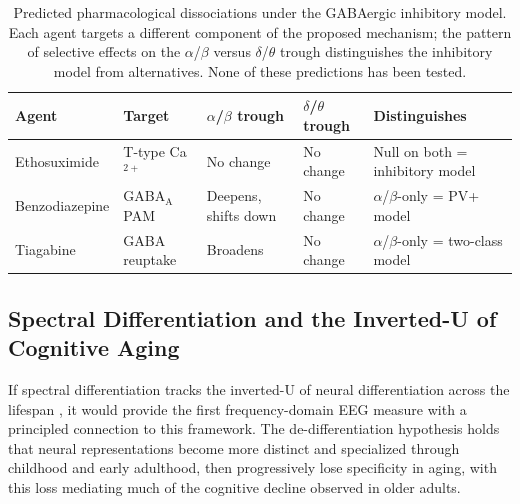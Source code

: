 \begin{table}[h]
\centering
\caption{Predicted pharmacological dissociations under the GABAergic inhibitory model. Each agent targets a different component of the proposed mechanism; the pattern of selective effects on the $\alpha$/$\beta$ versus $\delta$/$\theta$ trough distinguishes the inhibitory model from alternatives. None of these predictions has been tested.}
\label{tab:pharmacological}
\begin{tabular}{l l l l l}
\toprule
Agent & Target & $\alpha$/$\beta$ trough & $\delta$/$\theta$ trough & Distinguishes \\
\midrule
Ethosuximide & T-type Ca$^{2+}$ & No change & No change & Null on both = inhibitory model \\
Benzodiazepine & GABA$_\text{A}$ PAM & Deepens, shifts down & No change & $\alpha$/$\beta$-only = PV+ model \\
Tiagabine & GABA reuptake & Broadens & No change & $\alpha$/$\beta$-only = two-class model \\
\bottomrule
\end{tabular}
\end{table}

\subsection{Spectral Differentiation and the Inverted-U of Cognitive Aging}

If spectral differentiation tracks the inverted-U of neural differentiation across the lifespan \parencite{li2004dedifferentiation}, it would provide the first frequency-domain EEG measure with a principled connection to this framework. The de-differentiation hypothesis holds that neural representations become more distinct and specialized through childhood and early adulthood, then progressively lose specificity in aging, with this loss mediating much of the cognitive decline observed in older adults.

